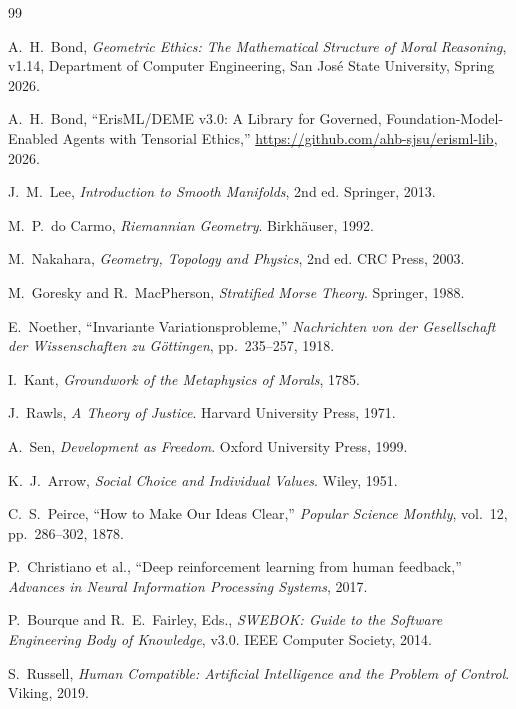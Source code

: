 \documentclass[12pt,letterpaper,twoside,openright]{book}
\theoremstyle{plain}
\theoremstyle{definition}
\theoremstyle{remark}
\begin{document}
\begin{thebibliography}{99}

A.~H.~Bond, \emph{Geometric Ethics: The Mathematical Structure of Moral Reasoning}, v1.14, Department of Computer Engineering, San Jos\'{e} State University, Spring 2026.

A.~H.~Bond, ``ErisML/DEME v3.0: A Library for Governed, Foundation-Model-Enabled Agents with Tensorial Ethics,'' \url{https://github.com/ahb-sjsu/erisml-lib}, 2026.

J.~M.~Lee, \emph{Introduction to Smooth Manifolds}, 2nd ed. Springer, 2013.

M.~P.~do Carmo, \emph{Riemannian Geometry}. Birkh\"{a}user, 1992.

M.~Nakahara, \emph{Geometry, Topology and Physics}, 2nd ed. CRC Press, 2003.

M.~Goresky and R.~MacPherson, \emph{Stratified Morse Theory}. Springer, 1988.

E.~Noether, ``Invariante Variationsprobleme,'' \emph{Nachrichten von der Gesellschaft der Wissenschaften zu G\"{o}ttingen}, pp.~235--257, 1918.

I.~Kant, \emph{Groundwork of the Metaphysics of Morals}, 1785.

J.~Rawls, \emph{A Theory of Justice}. Harvard University Press, 1971.

A.~Sen, \emph{Development as Freedom}. Oxford University Press, 1999.

K.~J.~Arrow, \emph{Social Choice and Individual Values}. Wiley, 1951.

C.~S.~Peirce, ``How to Make Our Ideas Clear,'' \emph{Popular Science Monthly}, vol.~12, pp.~286--302, 1878.

P.~Christiano et al., ``Deep reinforcement learning from human feedback,'' \emph{Advances in Neural Information Processing Systems}, 2017.

P.~Bourque and R.~E.~Fairley, Eds., \emph{SWEBOK: Guide to the Software Engineering Body of Knowledge}, v3.0. IEEE Computer Society, 2014.

S.~Russell, \emph{Human Compatible: Artificial Intelligence and the Problem of Control}. Viking, 2019.


\end{thebibliography}

\printindex
\end{document}
